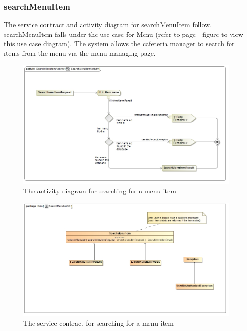 \documentclass[a4paper,12pt]{report}
\begin{document}
 \subsubsection{searchMenuItem}
The service contract and activity diagram for searchMenuItem follow. searchMenuItem falls under the use case for Menu (refer to page   - figure   to view this use case diagram). The system allows the cafeteria manager to search for items from the menu via the menu managing page.
\begin{figure}[H]
  \centering
    \includegraphics[width=1.0\textwidth]{../images/SearchMenuItemActivity.jpg}
    \caption{The activity diagram for searching for a menu item } 
\end{figure}
\begin{figure}[H]
	\centering
	\includegraphics[width=1.0\textwidth]{../images/SearchMenuItemSC.jpg}
	\caption{The service contract for searching for a menu item}
\end{figure}
\end{document}
